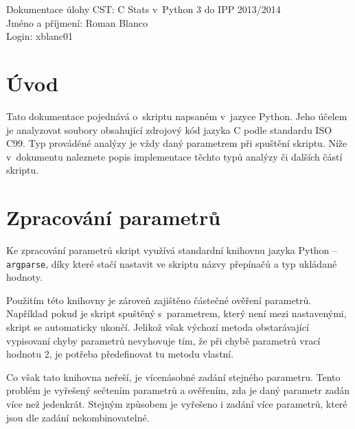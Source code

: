 \documentclass[10pt,a4paper,final]{article}
\begin{document}

  \pagestyle{plain}
  \setcounter{page}{1}
  
  \setlength{\parindent}{1cm}
  \setlength{\parskip}{0.5cm plus4mm minus3mm}
  
  \noindent
  Dokumentace úlohy CST: C Stats v~Python 3 do IPP 2013/2014 \\
  Jméno a příjmení: Roman Blanco \\
  Login: xblanc01 \\

  \section{Úvod} \label{uvod}

    Tato dokumentace pojednává o~skriptu napsaném v~jazyce Python.
    Jeho účelem je analyzovat soubory obsahující zdrojový kód jazyka C podle
    standardu ISO C99.
    Typ prováděné analýzy je vždy daný parametrem při spuštění skriptu. Níže
    v~dokumentu naleznete popis implementace těchto typů analýzy či dalších
    částí skriptu.

  \section{Zpracování parametrů} \label{zpracovani-parametru}

    Ke zpracování parametrů skript využívá standardní knihovnu jazyka Python --
    \texttt{argparse}, díky které stačí nastavit ve skriptu názvy přepínačů a
    typ ukládané hodnoty.

    Použitím této knihovny je zároveň zajištěno částečné ověření parametrů.
    Například pokud je skript spuštěný s~parametrem, který není mezi
    nastavenými, skript se automaticky ukončí. Jelikož však výchozí metoda
    obstarávající vypisovaní chyby parametrů nevyhovuje tím, že při chybě
    parametrů vrací hodnotu 2, je potřeba předefinovat tu metodu vlastní.

    Co však tato knihovna neřeší, je vícenásobné zadání stejného parametru.
    Tento problém je vyřešený sečtením parametrů a ověřením, zda je daný
    parametr zadán více než jedenkrát. Stejným způsobem je vyřešeno i zadání
    více parametrů, které jsou dle zadání nekombinovatelné.
\end{document}
